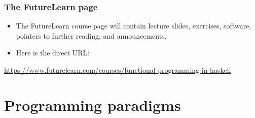 \documentclass{beamer}
\begin{document}

\begin{frame}[fragile]
\frametitle{The FutureLearn page}

\begin{itemize}
\item The FutureLearn course page will contain lecture slides, exercises,
  software, pointers to further reading, and announcements.
\item Here is the direct URL:
\end{itemize}

\url{https://www.futurelearn.com/courses/functional-programming-in-haskell}

\end{frame}
%
%

\section{Programming paradigms}
\end{document}
